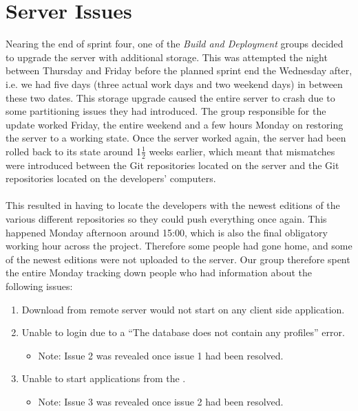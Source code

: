 
\section{Server Issues}
\label{sec:server_issues}


Nearing the end of sprint four, one of the \emph{Build and Deployment} groups decided to upgrade the server with additional storage. This was attempted the night between Thursday and Friday before the planned sprint end the Wednesday after, i.e. we had five days (three actual work days and two weekend days) in between these two dates. This storage upgrade caused the entire server to crash due to some partitioning issues they had introduced. The group responsible for the update worked Friday, the entire weekend and a few hours Monday on restoring the server to a working state. Once the server worked again, the server had been rolled back to its state around 1$\frac{1}{2}$ weeks earlier, which meant that mismatches were introduced between the Git repositories located on the server and the Git repositories located on the developers' computers. 
\\\\

This resulted in having to locate the developers with the newest editions of the various different repositories so they could push everything once again. This happened Monday afternoon around 15:00, which is also the final obligatory working hour across the project. Therefore some people had gone home, and some of the newest editions were not uploaded to the server. Our group therefore spent the entire Monday tracking down people who had information about the following issues:

\begin{enumerate}
    \item Download from remote server would not start on any client side application.
    \item Unable to login due to a ``The database does not contain any profiles'' error.
    \begin{itemize}
        \item Note: Issue 2 was revealed once issue 1 had been resolved.
    \end{itemize}
    \item Unable to start applications from the \launcher.   
    \begin{itemize}
        \item Note: Issue 3 was revealed once issue 2 had been resolved. 
    \end{itemize}
\end{enumerate}


